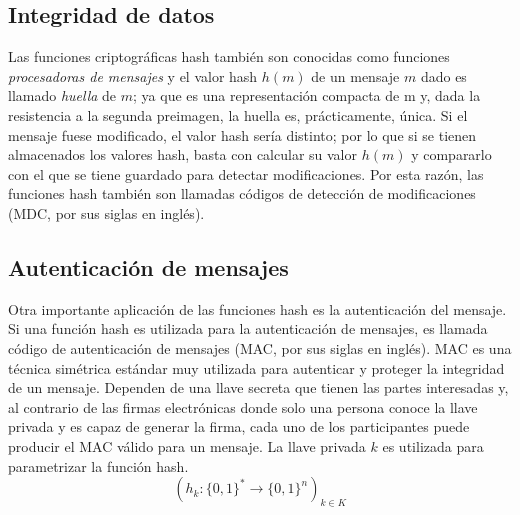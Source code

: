 \subsection{Integridad de datos}
Las funciones criptográficas hash también son conocidas como funciones
\textit{procesadoras de mensajes} y el valor hash $h(m)$ de un mensaje
$m$ dado es llamado \textit{huella} de $m$; ya que es una representación
compacta de m y, dada la resistencia a la segunda preimagen, la huella 
es, prácticamente, única. Si el mensaje fuese modificado, el valor hash
sería distinto; por lo que si se tienen almacenados los valores hash, 
basta con calcular su valor $h(m)$ y compararlo con el que se tiene 
guardado para detectar modificaciones. Por esta razón, las funciones
hash también son llamadas códigos de detección de modificaciones (MDC, 
por sus siglas en inglés).

\subsection{Autenticación de mensajes}
Otra importante aplicación de las funciones hash es la autenticación del mensaje. Si una función hash es utilizada para la autenticación de 
mensajes, es llamada código de autenticación de mensajes (MAC, por sus
siglas en inglés). MAC es una técnica simétrica estándar muy utilizada para autenticar y proteger la integridad de un mensaje. Dependen de 
una llave secreta que tienen las partes interesadas y, al contrario de las
firmas electrónicas donde solo una persona conoce la llave privada y es
capaz de generar la firma, cada uno de los participantes puede producir
el MAC válido para un mensaje. La llave privada $k$ es utilizada para
parametrizar la función hash.
\begin{equation}
  \label{funcion_hash_mac}
 	(h_k: \{0, 1\}^* \longrightarrow \{0,1\}^n)_{k \in K}
\end{equation}

